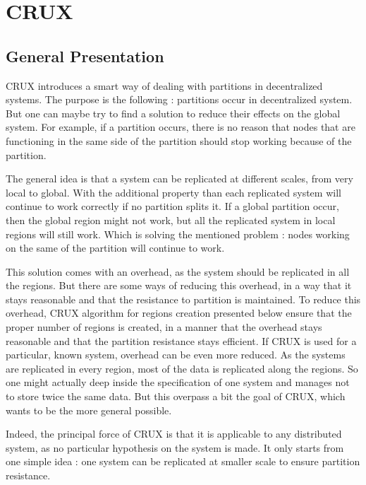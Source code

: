 \documentclass[a4paper,11pt,oneside]{report}
\begin{document}
\section{CRUX}

\subsection{General Presentation} CRUX introduces a smart way of dealing with
partitions in decentralized systems. The purpose is the following : partitions
occur in decentralized system. But one can maybe try to find a solution to
reduce their effects on the global system. For example, if a partition occurs,
there is no reason that nodes that are functioning in the same side of the
partition should stop working because of the partition. 

The general idea is that a system can be replicated at different scales, from
very local to global.  With the additional property than each replicated system
will continue to work correctly if no partition splits it. If a global
partition occur, then the global region might not work, but all the replicated
system in local regions will still work. Which is solving the mentioned problem
: nodes working on the same of the partition will continue to work.

This solution comes with an overhead, as the system should be replicated in all
the regions. But there are some ways of reducing this overhead, in a way that
it stays reasonable and that the resistance to partition is maintained. To
reduce this overhead, CRUX algorithm for regions creation presented below
ensure that the proper number of regions is created, in a manner that the
overhead stays reasonable and that the partition resistance stays efficient. If
CRUX is used for a particular, known system, overhead can be even more reduced.
As the systems are replicated in every region, most of the data is replicated
along the regions. So one might actually deep inside the specification of one
system and manages not to store twice the same data. But this overpass a bit
the goal of CRUX, which wants to be the more general possible. 

Indeed, the principal force of CRUX is that it is applicable to any distributed
system, as no particular hypothesis on the system is made. It only starts from
one simple idea : one system can be replicated at smaller scale to ensure
partition resistance. 
\end{document}
